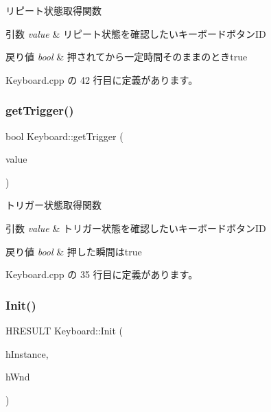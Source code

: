 リピート状態取得関数 


\begin{DoxyParams}{引数}
{\em value} & リピート状態を確認したいキーボードボタン\+ID \\
\hline
\end{DoxyParams}

\begin{DoxyRetVals}{戻り値}
{\em bool} & 押されてから一定時間そのままのときtrue \\
\hline
\end{DoxyRetVals}


 Keyboard.\+cpp の 42 行目に定義があります。

\mbox{\label{class_keyboard_a74cad384c6592d1db0c3a8a50ae9ff9e}} 
\subsubsection{\texorpdfstring{get\+Trigger()}{getTrigger()}}
{\footnotesize\ttfamily bool Keyboard\+::get\+Trigger (\begin{DoxyParamCaption}\item[{int}]{value }\end{DoxyParamCaption})}



トリガー状態取得関数 


\begin{DoxyParams}{引数}
{\em value} & トリガー状態を確認したいキーボードボタン\+ID \\
\hline
\end{DoxyParams}

\begin{DoxyRetVals}{戻り値}
{\em bool} & 押した瞬間はtrue \\
\hline
\end{DoxyRetVals}


 Keyboard.\+cpp の 35 行目に定義があります。

\mbox{\label{class_keyboard_a5de6d3cc2a2a6ac69945f7075d58547d}} 
\subsubsection{\texorpdfstring{Init()}{Init()}}
{\footnotesize\ttfamily H\+R\+E\+S\+U\+LT Keyboard\+::\+Init (\begin{DoxyParamCaption}\item[{H\+I\+N\+S\+T\+A\+N\+CE}]{h\+Instance,  }\item[{H\+W\+ND}]{h\+Wnd }\end{DoxyParamCaption})}



